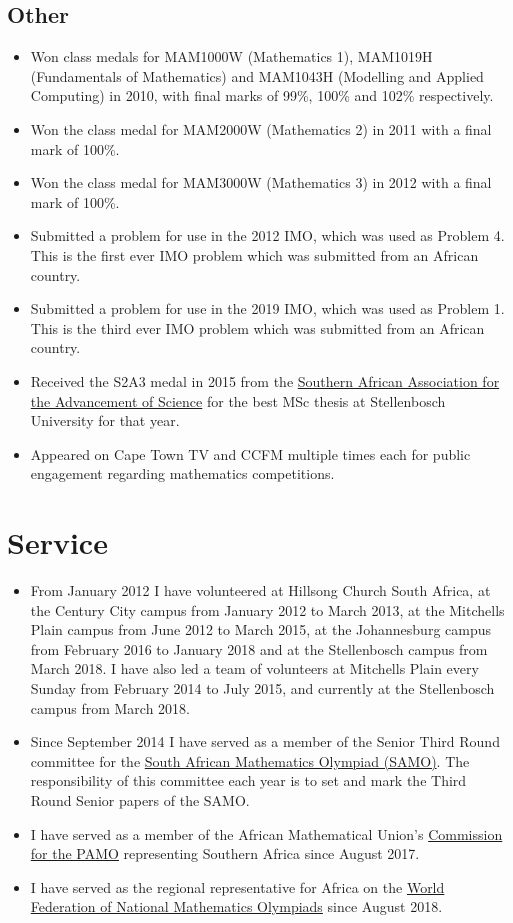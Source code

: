 \documentclass{article}
\begin{document}
\subsection{Other}
\begin{itemize}
	\item Won class medals for MAM1000W (Mathematics 1), MAM1019H (Fundamentals of Mathematics) and MAM1043H (Modelling and Applied Computing) in 2010, with final marks of 99\%, 100\% and 102\% respectively.
	\item Won the class medal for MAM2000W (Mathematics 2) in 2011 with a final mark of 100\%.
	\item Won the class medal for MAM3000W (Mathematics 3) in 2012 with a final mark of 100\%.
	\item Submitted a problem for use in the 2012 IMO, which was used as Problem 4. This is the first ever IMO problem which was submitted from an African country.
	\item Submitted a problem for use in the 2019 IMO, which was used as Problem 1. This is the third ever IMO problem which was submitted from an African country.
	\item Received the S2A3 medal in 2015 from the \href{http://s2a3.org.za/joomla/index.php}{Southern African Association for the Advancement of Science} for the best MSc thesis at Stellenbosch University for that year.
	\item Appeared on Cape Town TV and CCFM multiple times each for public engagement regarding mathematics competitions.
\end{itemize}


\clearpage
\section{Service}
\begin{itemize}
	\item From January 2012 I have volunteered at Hillsong Church South Africa, at the Century City campus from January 2012 to March 2013, at the Mitchells Plain campus from June 2012 to March 2015, at the Johannesburg campus from February 2016 to January 2018 and at the Stellenbosch campus from March 2018. I have also led a team of volunteers at Mitchells Plain every Sunday from February 2014 to July 2015, and currently at the Stellenbosch campus from March 2018.
	\item Since September 2014 I have served as a member of the Senior Third Round committee for the \href{http://www.samf.ac.za/sa-mathematics-olympiad}{South African Mathematics Olympiad (SAMO)}. The responsibility of this committee each year is to set and mark the Third Round Senior papers of the SAMO.
	\item I have served as a member of the African Mathematical Union's \href{http://www.africamathunion.org/amu-pamoc/}{Commission for the PAMO} representing Southern Africa since August 2017.
	\item I have served as the regional representative for Africa on the \href{http://www.wfnmc.org/}{World Federation of National Mathematics Olympiads} since August 2018.
\end{itemize}
\end{document}
